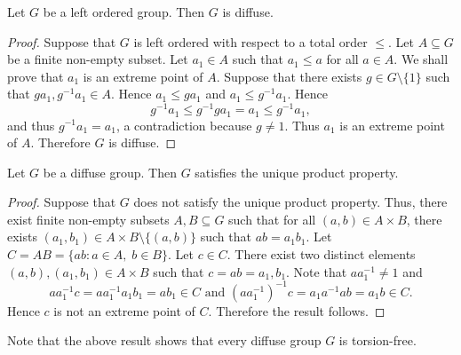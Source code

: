 \begin{lemma}\label{lem:LOimpliesdiffuse}
	Let $G$ be a left ordered group. Then $G$ is diffuse.	
\end{lemma}

\begin{proof}
	Suppose that $G$ is left ordered with respect to a total order $\leq$. Let $A\subseteq G$ be a finite non-empty subset. Let $a_1\in A$ such that $a_1\leq a$ for all $a\in A$. We shall prove that $a_1$ is an extreme point of $A$. Suppose that there exists $g\in G\setminus\{ 1\}$ such that $ga_1,g^{-1}a_1\in A$. Hence $a_1\leq ga_1$ and $a_1\leq g^{-1}a_1$. Hence
	\[ g^{-1}a_1\leq g^{-1}ga_1=a_1\leq g^{-1}a_1,\]
	and thus $g^{-1}a_1=a_1$, a contradiction because $g\neq 1$. Thus $a_1$ is an extreme point of $A$. Therefore $G$ is diffuse. 
\end{proof}

\begin{lemma}
	\label{lemma:difuso=>2up}
	Let $G$ be a diffuse group. Then $G$ satisfies the unique product property.	
\end{lemma}

\begin{proof}
	Suppose that $G$ does not satisfy the unique product property. Thus, there exist finite non-empty subsets $A,B\subseteq G$ 
	such that for all $(a,b)\in A\times B$, there exists $(a_1,b_1)\in A\times B\setminus\{ (a,b)\}$ such that $ab=a_1b_1$.
	Let $C=AB=\{ ab : a\in A,\; b\in B\}$. Let $c\in C$. There exist two distinct elements $(a,b),(a_1,b_1)\in A\times B$ such that 
	$c=ab=a_1,b_1$. Note that $aa_1^{-1}\neq 1$ and
	\[ aa_1^{-1}c=aa_1^{-1}a_1b_1=ab_1\in C \text{ and } (aa_1^{-1})^{-1}c=a_1a^{-1}ab=a_1b\in C.\]
	Hence $c$ is not an extreme point of $C$. Therefore the result follows.
\end{proof}

Note that the above result shows that every diffuse group $G$ is torsion-free.


